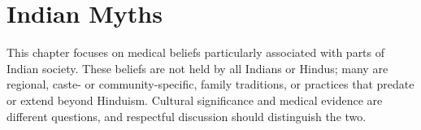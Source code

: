 \chapter{Indian Myths}
This chapter focuses on medical beliefs particularly associated with parts of Indian society. These beliefs are not held by all Indians or Hindus; many are regional, caste- or community-specific, family traditions, or practices that predate or extend beyond Hinduism. Cultural significance and medical evidence are different questions, and respectful discussion should distinguish the two.

\newcommand{\indianentry}[6]{%
\item[] \textbf{#1.} \textbf{Myth:} #2\newline
\textbf{Status:} #3.\newline
\textbf{Fact:} #4 \cite{#5}\newline
\textbf{Implications:} #6
}
